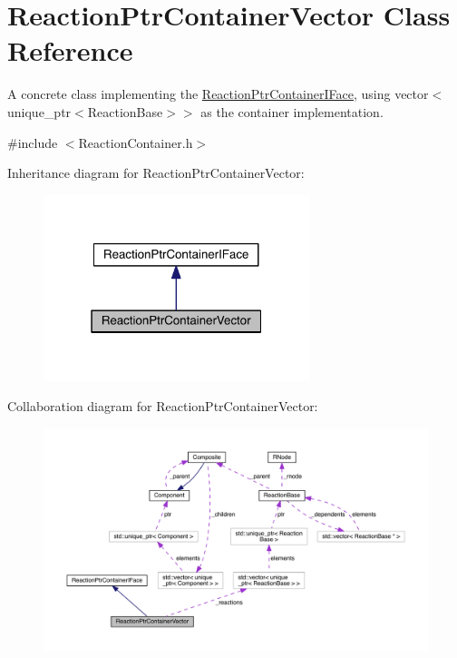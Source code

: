 \hypertarget{classReactionPtrContainerVector}{\section{Reaction\+Ptr\+Container\+Vector Class Reference}
\label{classReactionPtrContainerVector}
}


A concrete class implementing the \hyperlink{classReactionPtrContainerIFace}{Reaction\+Ptr\+Container\+I\+Face}, using vector$<$unique\+\_\+ptr$<$\+Reaction\+Base$>$$>$ as the container implementation.  




{\ttfamily \#include $<$Reaction\+Container.\+h$>$}



Inheritance diagram for Reaction\+Ptr\+Container\+Vector\+:\nopagebreak
\begin{figure}[H]
\begin{center}
\leavevmode
\includegraphics[width=220pt]{classReactionPtrContainerVector__inherit__graph}
\end{center}
\end{figure}


Collaboration diagram for Reaction\+Ptr\+Container\+Vector\+:\nopagebreak
\begin{figure}[H]
\begin{center}
\leavevmode
\includegraphics[width=350pt]{classReactionPtrContainerVector__coll__graph}
\end{center}
\end{figure}

